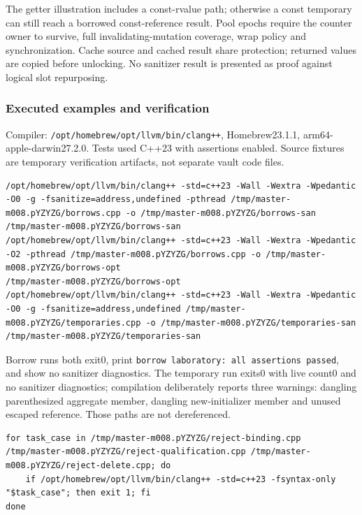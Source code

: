 The getter illustration includes a const-rvalue path; otherwise a const temporary can still reach a borrowed const-reference result. Pool epochs require the counter owner to survive, full invalidating-mutation coverage, wrap policy and synchronization. Cache source and cached result share protection; returned values are copied before unlocking. No sanitizer result is presented as proof against logical slot repurposing.

\subsubsection{Executed examples and verification}\label{appendix-a103e7846d21-executed-examples-and-verification}

Compiler: \texttt{/opt/homebrew/opt/llvm/bin/clang++}, Homebrew23.1.1, arm64-apple-darwin27.2.0. Tests used C++23 with assertions enabled. Source fixtures are temporary verification artifacts, not separate vault code files.

\begin{verbatim}
/opt/homebrew/opt/llvm/bin/clang++ -std=c++23 -Wall -Wextra -Wpedantic -O0 -g -fsanitize=address,undefined -pthread /tmp/master-m008.pYZYZG/borrows.cpp -o /tmp/master-m008.pYZYZG/borrows-san
/tmp/master-m008.pYZYZG/borrows-san
/opt/homebrew/opt/llvm/bin/clang++ -std=c++23 -Wall -Wextra -Wpedantic -O2 -pthread /tmp/master-m008.pYZYZG/borrows.cpp -o /tmp/master-m008.pYZYZG/borrows-opt
/tmp/master-m008.pYZYZG/borrows-opt
/opt/homebrew/opt/llvm/bin/clang++ -std=c++23 -Wall -Wextra -Wpedantic -O0 -g -fsanitize=address,undefined /tmp/master-m008.pYZYZG/temporaries.cpp -o /tmp/master-m008.pYZYZG/temporaries-san
/tmp/master-m008.pYZYZG/temporaries-san
\end{verbatim}

Borrow runs both exit0, print \texttt{borrow\ laboratory:\ all\ assertions\ passed}, and show no sanitizer diagnostics. The temporary run exits0 with live count0 and no sanitizer diagnostics; compilation deliberately reports three warnings: dangling parenthesized aggregate member, dangling new-initializer member and unused escaped reference. Those paths are not dereferenced.

\begin{verbatim}
for task_case in /tmp/master-m008.pYZYZG/reject-binding.cpp /tmp/master-m008.pYZYZG/reject-qualification.cpp /tmp/master-m008.pYZYZG/reject-delete.cpp; do
    if /opt/homebrew/opt/llvm/bin/clang++ -std=c++23 -fsyntax-only "$task_case"; then exit 1; fi
done
\end{verbatim}

